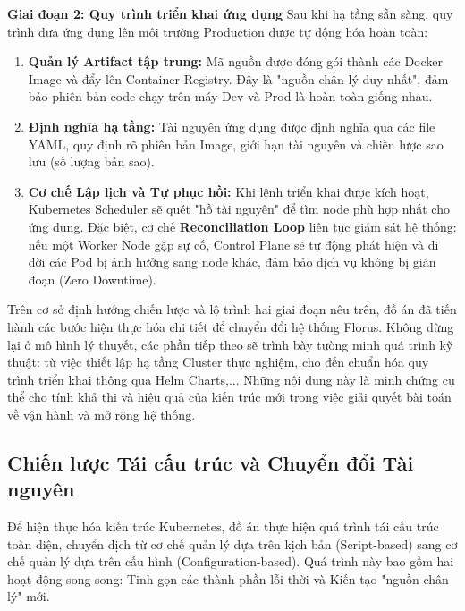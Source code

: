 \textbf{Giai đoạn 2: Quy trình triển khai ứng dụng} 
\newline
\indent
Sau khi hạ tầng sẵn sàng, quy trình đưa ứng dụng lên môi trường Production được tự động hóa hoàn toàn:

\begin{enumerate} 
    \item \textbf{Quản lý Artifact tập trung:} Mã nguồn được đóng gói thành các Docker Image và đẩy lên Container Registry. Đây là "nguồn chân lý duy nhất", đảm bảo phiên bản code chạy trên máy Dev và Prod là hoàn toàn giống nhau.

    \item \textbf{Định nghĩa hạ tầng:} Tài nguyên ứng dụng được định nghĩa qua các file YAML, quy định rõ phiên bản Image, giới hạn tài nguyên và chiến lược sao lưu (số lượng bản sao).

    \item \textbf{Cơ chế Lập lịch và Tự phục hồi:} Khi lệnh triển khai được kích hoạt, Kubernetes Scheduler sẽ quét "hồ tài nguyên" để tìm node phù hợp nhất cho ứng dụng. Đặc biệt, cơ chế \textbf{Reconciliation Loop} liên tục giám sát hệ thống: nếu một Worker Node gặp sự cố, Control Plane sẽ tự động phát hiện và di dời các Pod bị ảnh hưởng sang node khác, đảm bảo dịch vụ không bị gián đoạn (Zero Downtime).
\end{enumerate}

Trên cơ sở định hướng chiến lược và lộ trình hai giai đoạn nêu trên, đồ án đã tiến hành các bước hiện thực hóa chi tiết để chuyển đổi hệ thống Florus. Không dừng lại ở mô hình lý thuyết, các phần tiếp theo sẽ trình bày tường minh quá trình kỹ thuật: từ việc thiết lập hạ tầng Cluster thực nghiệm, cho đến chuẩn hóa quy trình triển khai thông qua Helm Charts,... Những nội dung này là minh chứng cụ thể cho tính khả thi và hiệu quả của kiến trúc mới trong việc giải quyết bài toán về vận hành và mở rộng hệ thống.

\subsection{Chiến lược Tái cấu trúc và Chuyển đổi Tài nguyên}

Để hiện thực hóa kiến trúc Kubernetes, đồ án thực hiện quá trình tái cấu trúc toàn diện, chuyển dịch từ cơ chế quản lý dựa trên kịch bản (Script-based) sang cơ chế quản lý dựa trên cấu hình (Configuration-based). Quá trình này bao gồm hai hoạt động song song: Tinh gọn các thành phần lỗi thời và Kiến tạo "nguồn chân lý" mới.

